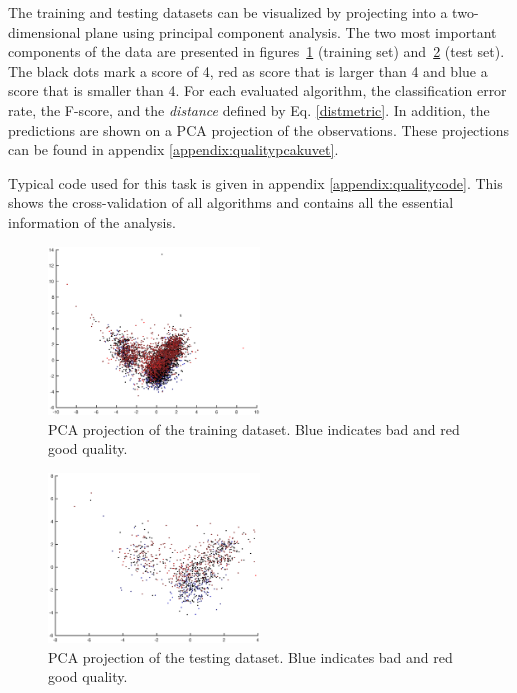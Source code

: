 \documentclass[twoside]{article}
\begin{document}
\begin{multicols}{2}
The training and testing datasets can be visualized by projecting into a two-dimensional plane using principal component analysis. The 
two most important components of the data are presented in figures~\ref{fig:quality_training_pca} (training set) and~\ref{fig:quality_testing_pca}
(test set).
The black dots mark a score of 4, red as score that is larger than 4 and blue a score that is smaller than 4.
For each evaluated algorithm, the classification error rate, the F-score, and the \emph{distance} defined by Eq. \eqref{distmetric}. In addition, the predictions are shown on a PCA projection
of the observations. These projections can be found in appendix \ref{appendix:qualitypcakuvet}.

Typical code used for this task is given in appendix \ref{appendix:qualitycode}. This shows the cross-validation of all algorithms and
contains all the essential information of the analysis.

\begin{figure}[H]
\centering
\includegraphics[width=0.5\textwidth]{qpcatraining}
\caption{PCA projection of the training dataset. Blue indicates bad and red good quality.}
\label{fig:quality_training_pca}
\end{figure}

\begin{figure}[H]
\centering
\includegraphics[width=0.5\textwidth]{qpcatesting}
\caption{PCA projection of the testing dataset. Blue indicates bad and red good quality.}
\label{fig:quality_testing_pca}
\end{figure}


\end{multicols}
\end{document}
